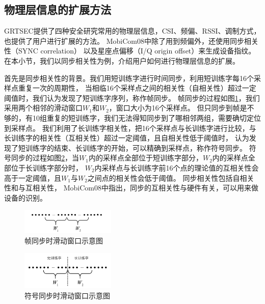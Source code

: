 		\subsection{物理层信息的扩展方法}\label{subsec:grtsec_phyinfo_extension}
		GRTSEC提供了四种安全研究常用的物理层信息，CSI、频偏、RSSI、调制方式，也提供了用户进行扩展的方法。
		MobiCom08\cite{mobicom08radiometric}中除了用到频偏外，还使用同步相关性（SYNC correlation）
		以及星座点偏移（I/Q origin offset）来生成设备指纹。
		在本小节，我们以同步相关性为例，介绍用户如何进行物理层信息的扩展。

		首先是同步相关性的背景。我们用短训练字进行时间同步，利用短训练字每16个采样点重复一次的周期性，
		当相临16个采样点之间的相关性（自相关性）超过一定阈值时，我们认为发现了短训练字序列，称作帧同步。
		帧同步的过程如图\ref{fig:sync_sliding_window}，我们采用两个相邻的滑动窗口$W_1$和$W_2$，窗口大小为16个采样点。
		但只同步到帧是不够的，有10组重复的短训练字，我们无法得知同步到了哪相邻两组，需要确切定位到采样点。
		我们利用了长训练字相关性，把16个采样点与长训练字进行比较，与长训练字的相关性（互相关性）超过一定阈值，且自相关性低于阈值时，
		认为发现了短训练字的结束、长训练字的开始，可以精确到采样点，称作符号同步。
		符号同步的过程如图\ref{fig:sync_sliding_window_lts}，当$W_1$内的采样点全部位于短训练字部分，$W_2$内的采样点全部位于长训练字部分时，
		$W_2$内采样点与长训练字前16个点的理论值的互相关性会高于一定阈值，且$W_1$与$W_2$之间点的相关性会低于阈值。
		同步相关性包括自相关性和与互相关性，
		MobiCom08\cite{mobicom08radiometric}中指出，同步的互相关性与硬件有关，可以用来做设备的识别。

			\begin{figure}
				\centering
				\includegraphics[width=0.4\textwidth]{img/sync_sliding_window.png}
				\caption{帧同步时滑动窗口示意图}
				\label{fig:sync_sliding_window}
			\end{figure}

			\begin{figure}
				\centering
				\includegraphics[width=0.4\textwidth]{img/sync_sliding_window_lts.png}
				\caption{符号同步时滑动窗口示意图}
				\label{fig:sync_sliding_window_lts}
			\end{figure}

